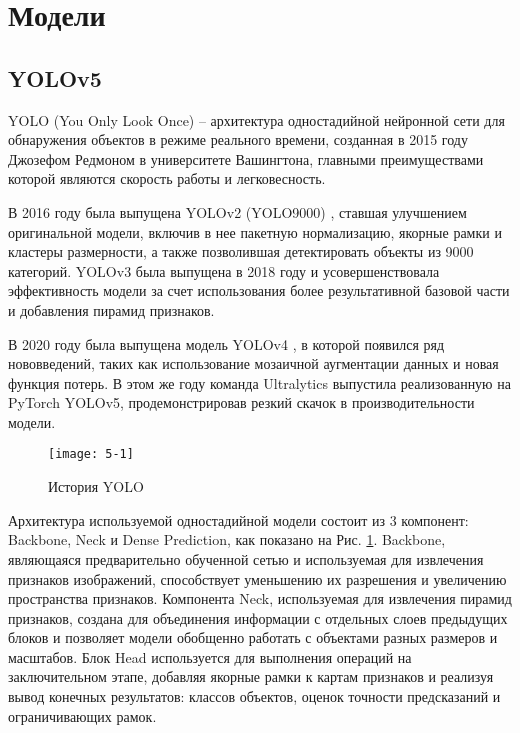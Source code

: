 \section{Модели}

\subsection{YOLOv5}

YOLO (You Only Look Once) -- архитектура одностадийной нейронной сети для обнаружения объектов в режиме реального времени, созданная в 2015 году Джозефом Редмоном в университете Вашингтона, главными преимуществами которой являются скорость работы и легковесность.

В 2016 году была выпущена YOLOv2 (YOLO9000) \cite{5-2}, ставшая улучшением оригинальной модели, включив в нее пакетную нормализацию, якорные рамки и кластеры размерности, а также позволившая детектировать объекты из 9000 категорий. YOLOv3 \cite{5-3} была выпущена в 2018 году и усовершенствовала эффективность модели за счет использования более результативной базовой части и добавления пирамид признаков.

В 2020 году была выпущена модель YOLOv4 \cite{5-4}, в которой появился ряд нововведений, таких как использование мозаичной аугментации данных и новая функция потерь. В этом же году команда Ultralytics выпустила реализованную на PyTorch YOLOv5, продемонстрировав резкий скачок в производительности модели.

\begin{figure}[ht]
    \centering
    \texttt{[image: 5-1]}
    \caption{История YOLO}
    \label{img:5-1}
\end{figure}

Архитектура используемой одностадийной модели состоит из 3 компонент: Backbone, Neck и Dense Prediction, как показано на Рис. \ref{img:5-1}. Backbone, являющаяся предварительно обученной сетью и используемая для извлечения признаков изображений, способствует уменьшению их разрешения и увеличению пространства признаков. Компонента Neck, используемая для извлечения пирамид признаков, создана для объединения информации с отдельных слоев предыдущих блоков и позволяет модели обобщенно работать с объектами разных размеров и масштабов. Блок Head используется для выполнения операций на заключительном этапе, добавляя якорные рамки к картам признаков и реализуя вывод конечных результатов: классов объектов, оценок точности предсказаний и ограничивающих рамок.

